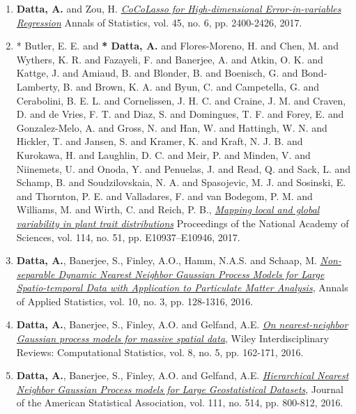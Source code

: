 \documentclass[11pt,a4paper,sans]{moderncv} %
\begin{document}
{\begin{enumerate}
\item \vskip 4mm \textbf{Datta, A.} and Zou, H. \href{https://projecteuclid.org/euclid.aos/1513328577}{\em CoCoLasso for High-dimensional Error-in-variables Regression} Annals of Statistics, vol. 45, no. 6, pp. 2400-2426, 2017.

\item \vskip 4mm * Butler, E. E. and \textbf{* Datta, A.} and Flores-Moreno, H. and Chen, M. and Wythers, K. R. and Fazayeli, F. and Banerjee, A. and Atkin, O. K. and Kattge, J. and Amiaud, B. and Blonder, B. and Boenisch, G. and Bond-Lamberty, B. and Brown, K. A. and Byun, C. and Campetella, G. and Cerabolini, B. E. L. and Cornelissen, J. H. C. and Craine, J. M. and Craven, D. and de Vries, F. T. and Diaz, S. and Domingues, T. F. and Forey, E. and Gonzalez-Melo, A. and Gross, N. and Han, W. and Hattingh, W. N. and Hickler, T. and Jansen, S. and Kramer, K. and Kraft, N. J. B. and Kurokawa, H. and Laughlin, D. C. and Meir, P. and Minden, V. and Niinemets, U. and Onoda, Y. and Penuelas, J. and Read, Q. and Sack, L. and Schamp, B. and Soudzilovskaia, N. A. and Spasojevic, M. J. and Sosinski, E. and Thornton, P. E. and Valladares, F. and van Bodegom, P. M. and Williams, M. and Wirth, C. and Reich, P. B.,  \href{http://www.pnas.org/content/114/51/E10937}{\em Mapping local and global variability in plant trait distributions} Proceedings of the National Academy of Sciences, vol. 114, no. 51, pp. E10937--E10946, 2017.

\item \vskip 4mm \textbf{Datta, A.}, Banerjee, S., Finley, A.O., Hamm, N.A.S. and Schaap, M.  \href{https://projecteuclid.org/euclid.aoas/1475069608}{\em Non-separable Dynamic Nearest Neighbor Gaussian Process Models for Large Spatio-temporal Data with Application to Particulate Matter Analysis}, Annals of Applied Statistics, vol. 10, no. 3, pp. 128-1316, 2016.

\item \vskip 4mm \textbf {Datta, A.}, Banerjee, S., Finley, A.O. and Gelfand, A.E.  \href{http://onlinelibrary.wiley.com/doi/10.1002/wics.1383/abstract}{\em On nearest-neighbor Gaussian process models for massive spatial data}, Wiley Interdisciplinary Reviews: Computational Statistics, vol. 8, no. 5, pp. 162-171, 2016.

\item \vskip 4mm \textbf {Datta, A.}, Banerjee, S., Finley, A.O. and Gelfand, A.E.  \href{http://www.tandfonline.com/doi/abs/10.1080/01621459.2015.1044091}{\em Hierarchical Nearest Neighbor Gaussian Process models for Large Geostatistical Datasets}, Journal of the American Statistical Association, vol. 111, no. 514, pp. 800-812, 2016.


\end{enumerate}}
\end{document}

